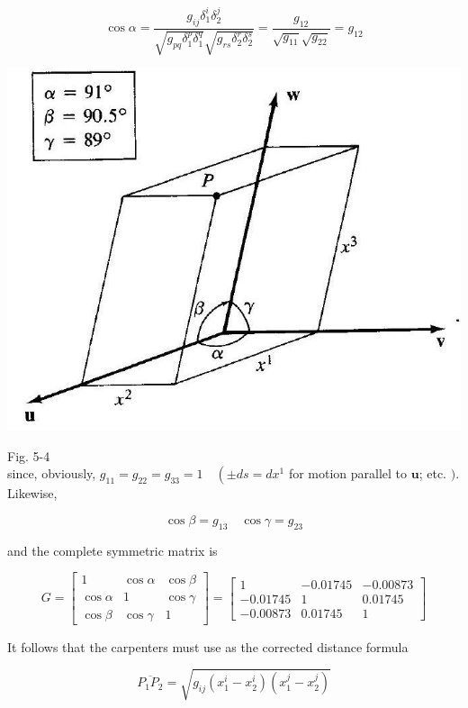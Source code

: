 \documentclass[10pt]{article}
\begin{document}
$$
\cos \alpha=\frac{g_{i j} \delta_{1}^{i} \delta_{2}^{j}}{\sqrt{g_{p q} \delta_{1}^{p} \delta_{1}^{q}} \sqrt{g_{r s} \delta_{2}^{r} \delta_{2}^{s}}}=\frac{g_{12}}{\sqrt{g_{11}} \sqrt{g_{22}}}=g_{12}
$$

\begin{center}
\includegraphics[max width=\textwidth]{2024_04_03_41f90be4f896e21f0dc9g-070}
\end{center}

Fig. 5-4\\
since, obviously, $g_{11}=g_{22}=g_{33}=1 \quad\left( \pm d s=d x^{1}\right.$ for motion parallel to $\mathbf{u}$; etc. $)$. Likewise,

$$
\cos \beta=g_{13} \quad \cos \gamma=g_{23}
$$

and the complete symmetric matrix is

$$
G=\left[\begin{array}{ccc}
1 & \cos \alpha & \cos \beta \\
\cos \alpha & 1 & \cos \gamma \\
\cos \beta & \cos \gamma & 1
\end{array}\right]=\left[\begin{array}{ccc}
1 & -0.01745 & -0.00873 \\
-0.01745 & 1 & 0.01745 \\
-0.00873 & 0.01745 & 1
\end{array}\right]
$$

It follows that the carpenters must use as the corrected distance formula

$$
\overline{P_{1} P_{2}}=\sqrt{g_{i j}\left(x_{1}^{i}-x_{2}^{i}\right)\left(x_{1}^{j}-x_{2}^{j}\right)}
$$
\end{document}
